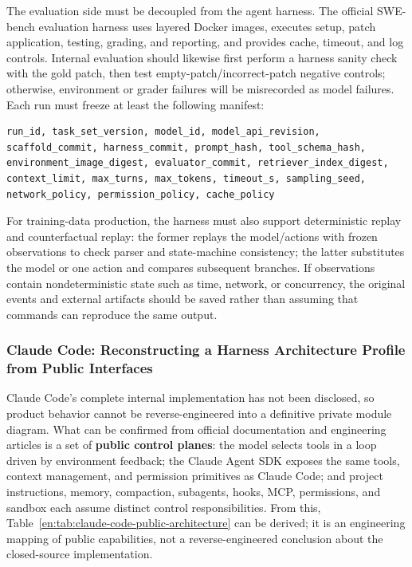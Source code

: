 \documentclass[10pt,a4paper,UTF8,fontset=none]{ctexart}
\begin{document}
The evaluation side must be decoupled from the agent harness. The official SWE-bench evaluation harness uses layered Docker images, executes setup, patch application, testing, grading, and reporting, and provides cache, timeout, and log controls\cite{en:swebenchharness2026}. Internal evaluation should likewise first perform a harness sanity check with the gold patch, then test empty-patch/incorrect-patch negative controls; otherwise, environment or grader failures will be misrecorded as model failures. Each run must freeze at least the following manifest:

\begin{lstlisting}[style=codeblock,caption={Minimal Reproducibility Information in a Harness Run Manifest},label={en:lst:harness-manifest}]
run_id, task_set_version, model_id, model_api_revision,
scaffold_commit, harness_commit, prompt_hash, tool_schema_hash,
environment_image_digest, evaluator_commit, retriever_index_digest,
context_limit, max_turns, max_tokens, timeout_s, sampling_seed,
network_policy, permission_policy, cache_policy
\end{lstlisting}

For training-data production, the harness must also support deterministic replay and counterfactual replay: the former replays the model/actions with frozen observations to check parser and state-machine consistency; the latter substitutes the model or one action and compares subsequent branches. If observations contain nondeterministic state such as time, network, or concurrency, the original events and external artifacts should be saved rather than assuming that commands can reproduce the same output.

\subsubsection{Claude Code: Reconstructing a Harness Architecture Profile from Public Interfaces}

Claude Code's complete internal implementation has not been disclosed, so product behavior cannot be reverse-engineered into a definitive private module diagram. What can be confirmed from official documentation and engineering articles is a set of \textbf{public control planes}: the model selects tools in a loop driven by environment feedback; the Claude Agent SDK exposes the same tools, context management, and permission primitives as Claude Code; and project instructions, memory, compaction, subagents, hooks, MCP, permissions, and sandbox each assume distinct control responsibilities\cite{en:anthropic2024agents,en:anthropic2025bestpractices,en:anthropic2025autonomy}. From this, Table~\ref{en:tab:claude-code-public-architecture} can be derived; it is an engineering mapping of public capabilities, not a reverse-engineered conclusion about the closed-source implementation.
\end{document}
